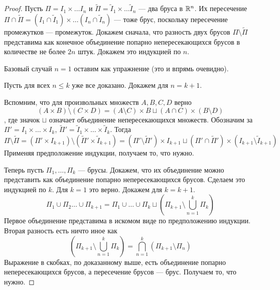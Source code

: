 \documentclass[a4paper, 12pt]{article}
\newcommand{\I}{\widetilde{I}}
\begin{document}
	\begin{proof}
		Пусть $\Pi = I_1 \times \ldots I_n$ и $\widetilde{\Pi} = \I_1 \times \ldots \I_n$ --- два бруса в $\mathbb{R}^n$. Их пересечение $\Pi \cap \widetilde{\Pi} = (I_1 \cap \I_1) \times \ldots (I_n\cap \I_n)$ --- тоже брус, поскольку пересечение промежутков --- промежуток.
		Докажем сначала, что разность двух брусов $\Pi \setminus \widetilde{\Pi}$ представима как конечное объединение попарно непересекающихся брусов в количестве не более $2n$ штук. Докажем это индукцией по $n$.
		\par Базовый случай $n=1$ оставим как упражнение (это и впрямь очевидно).
		\par Пусть для всех $n \leqslant k$ уже все доказано. Докажем для $n = k + 1$. 
		\par Вспомним, что для произвольных множеств $A, B, C, D$ верно
		$$
			(A\times B) \setminus (C \times D) = (A \setminus C) \times B \sqcup (A\cap C)\times (B \setminus D)
		$$
		, где значок $\sqcup$ означает объединение непересекающихся множеств.
		Обозначим за $\Pi' = I_1 \times \ldots \times I_k$, $\widetilde{\Pi}' = \I_1 \times \ldots \times \I_k$. Тогда
		$$
			\Pi \setminus \widetilde{\Pi} = (\Pi' \times I_{k+1}) \setminus (\widetilde{\Pi}' \times \I_{k + 1}) = (\Pi' \setminus \widetilde{\Pi}')\times I_{k + 1} \sqcup (\Pi' \cap \widetilde{\Pi}')\times (I_{k + 1} \setminus \I_{k + 1})
		$$
		Применяя предположение индукции, получаем то, что нужно.
		\par Теперь пусть $\Pi_1, \ldots, \Pi_k$ --- брусы. Докажем, что их объединение можно представить как объединение попарно непересекающихся брусов. Сделаем это индукцией по $k$. Для $k = 1$ это верно. Докажем для $k = k + 1$.
		$$
			\Pi_1 \cup \Pi_2 \ldots \cup \Pi_{k + 1} = \Pi_1 \cup \ldots \cup \Pi_{k} \sqcup \left(\Pi_{k + 1} \setminus \bigcup\limits_{n =1}^k\Pi_k\right)
		$$
		Первое объединение представима в искомом виде по предположению индукции. Вторая разность есть ничто иное как
		$$
			\left(\Pi_{k + 1} \setminus \bigcup\limits_{n =1}^k\Pi_k\right) = \bigcap\limits_{n=1}^{k}(\Pi_{k + 1} \setminus \Pi_n)
		$$
		Выражение в скобках, по доказанному выше, есть объединение попарно непересекающихся брусов, а пересечение брусов --- брус. Получаем то, что нужно.
	\end{proof}
\end{document}
